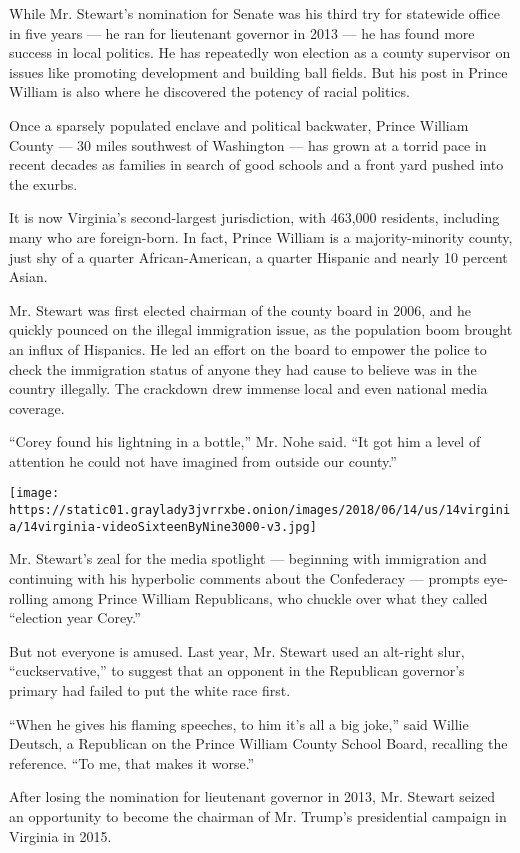While Mr. Stewart's nomination for Senate was his third try for
statewide office in five years --- he ran for lieutenant governor in
2013 --- he has found more success in local politics. He has repeatedly
won election as a county supervisor on issues like promoting development
and building ball fields. But his post in Prince William is also where
he discovered the potency of racial politics.

Once a sparsely populated enclave and political backwater, Prince
William County --- 30 miles southwest of Washington --- has grown at a
torrid pace in recent decades as families in search of good schools and
a front yard pushed into the exurbs.

It is now Virginia's second-largest jurisdiction, with 463,000
residents, including many who are foreign-born. In fact, Prince William
is a majority-minority county, just shy of a quarter African-American, a
quarter Hispanic and nearly 10 percent Asian.

Mr. Stewart was first elected chairman of the county board in 2006, and
he quickly pounced on the illegal immigration issue, as the population
boom brought an influx of Hispanics. He led an effort on the board to
empower the police to check the immigration status of anyone they had
cause to believe was in the country illegally. The crackdown drew
immense local and even national media coverage.

``Corey found his lightning in a bottle,'' Mr. Nohe said. ``It got him a
level of attention he could not have imagined from outside our county.''

\texttt{[image: https://static01.graylady3jvrrxbe.onion/images/2018/06/14/us/14virginia/14virginia-videoSixteenByNine3000-v3.jpg]}

Mr. Stewart's zeal for the media spotlight --- beginning with
immigration and continuing with his hyperbolic comments about the
Confederacy --- prompts eye-rolling among Prince William Republicans,
who chuckle over what they called ``election year Corey.''

But not everyone is amused. Last year, Mr. Stewart used an alt-right
slur, ``cuckservative,'' to suggest that an opponent in the Republican
governor's primary had failed to put the white race first.

``When he gives his flaming speeches, to him it's all a big joke,'' said
Willie Deutsch, a Republican on the Prince William County School Board,
recalling the reference. ``To me, that makes it worse.''

After losing the nomination for lieutenant governor in 2013, Mr. Stewart
seized an opportunity to become the chairman of Mr. Trump's presidential
campaign in Virginia in 2015.

